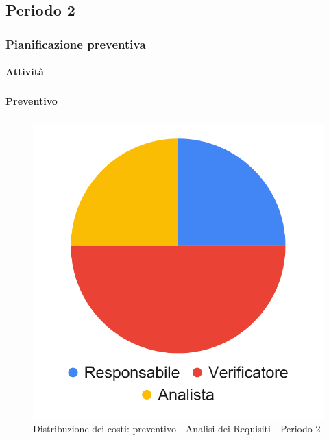 \pagebreak
\subsection{Periodo 2}

\subsubsection{Pianificazione preventiva}

\paragraph{Attività}
\subparagraph*{}

\planningTable{
	
}



\paragraph{Preventivo}
\subparagraph*{}

\hspace{-1cm}
\begin{minipage}{.50\textwidth}
\smallPreventivoTable{
	
}
\end{minipage}
\hspace{1cm}
\begin{minipage}{.40\textwidth}
\begin{figure}[H]
	\includegraphics[scale=0.21]{res/images/charts/preventivo_priori/Grafico4-2.png}
	\caption{Distribuzione dei costi: preventivo - Analisi dei Requisiti - Periodo 2}
\end{figure}
\end{minipage} 




